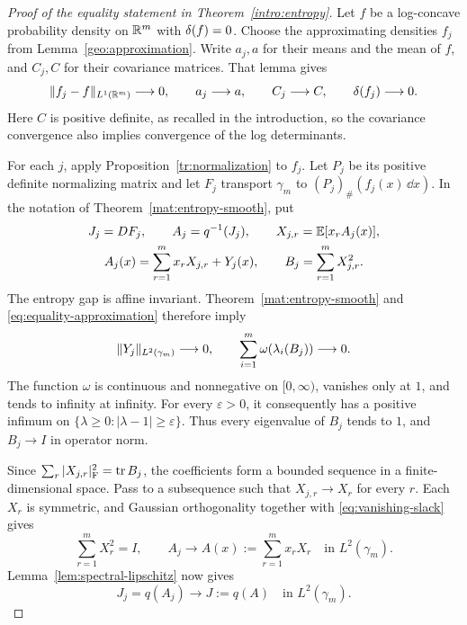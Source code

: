 \begin{proof}[Proof of the equality statement in Theorem~\ref{intro:entropy}]
Let $f$ be a log-concave probability density on $\mathbb R^m$ with
$\delta(f)=0$.  Choose the approximating densities $f_j$ from
Lemma~\ref{geo:approximation}.  Write $a_j,a$ for their means and the mean of
$f$, and $C_j,C$ for their covariance matrices.  That lemma gives
\begin{equation}\label{eq:equality-approximation}
  \lVert f_j-f\rVert_{L^1(\mathbb R^m)}\longrightarrow0,\qquad
  a_j\longrightarrow a,\qquad C_j\longrightarrow C,\qquad
  \delta(f_j)\longrightarrow0.
\end{equation}
Here $C$ is positive definite, as recalled in the introduction, so the
covariance convergence also implies convergence of the log determinants.

For each $j$, apply Proposition~\ref{tr:normalization} to $f_j$.
Let $P_j$ be its positive definite normalizing matrix and let $F_j$
transport $\gamma_m$ to $(P_j)_\#(f_j(x)\,\dd x)$.  In the notation
of Theorem~\ref{mat:entropy-smooth}, put
\[
 \begin{gathered}
  J_j=DF_j,\qquad A_j=q^{-1}(J_j),\qquad
  X_{j,r}=\mathbb E[x_rA_j(x)],\\
  A_j(x)=\sum_{r=1}^m x_rX_{j,r}+Y_j(x),\qquad
  B_j=\sum_{r=1}^m X_{j,r}^2.
 \end{gathered}
\]
The entropy gap is affine invariant.  Theorem~\ref{mat:entropy-smooth} and
\eqref{eq:equality-approximation} therefore imply
\begin{equation}\label{eq:vanishing-slack}
  \lVert Y_j\rVert_{L^2(\gamma_m)}\longrightarrow0,
  \qquad
  \sum_{i=1}^m \omega(\lambda_i(B_j))\longrightarrow0.
\end{equation}
The function $\omega$ is continuous and nonnegative on $[0,\infty)$,
vanishes only at $1$, and tends to infinity at infinity.
For every $\varepsilon>0$, it consequently has a positive infimum on
$\{\lambda\ge0:|\lambda-1|\ge\varepsilon\}$.  Thus every eigenvalue
of $B_j$ tends to $1$, and $B_j\to I$ in operator norm.

Since $\sum_r|X_{j,r}|_{\mathrm F}^2=\operatorname{tr} B_j$, the coefficients form
a bounded sequence in a finite-dimensional space.  Pass to a subsequence
such that $X_{j,r}\to X_r$ for every $r$.  Each $X_r$ is symmetric,
and Gaussian orthogonality together with \eqref{eq:vanishing-slack}
gives
\begin{equation}\label{eq:linear-field-limit}
  \sum_{r=1}^mX_r^2=I,\qquad
  A_j\longrightarrow A(x):=\sum_{r=1}^m x_rX_r
      \quad\text{in }L^2(\gamma_m).
\end{equation}
Lemma~\ref{lem:spectral-lipschitz} now gives
\begin{equation}\label{eq:jacobian-limit}
  J_j=q(A_j)\longrightarrow J:=q(A)
      \quad\text{in }L^2(\gamma_m).
\end{equation}


\end{proof}
